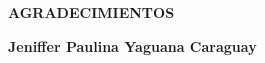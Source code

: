 \newpage
\vspace*{\fill}
\begin{flushright}
	\footnotesize
	\begin{minipage}{0.5\textwidth}
		\begin{flushright}
			\uppercase{\textbf{Agradecimientos}}
		\end{flushright}
		\itshape


		\bigbreak
		\begin{flushright}
			\textbf{Jeniffer Paulina Yaguana Caraguay}
		\end{flushright}
	\end{minipage}
\end{flushright}
\vspace*{\fill}
